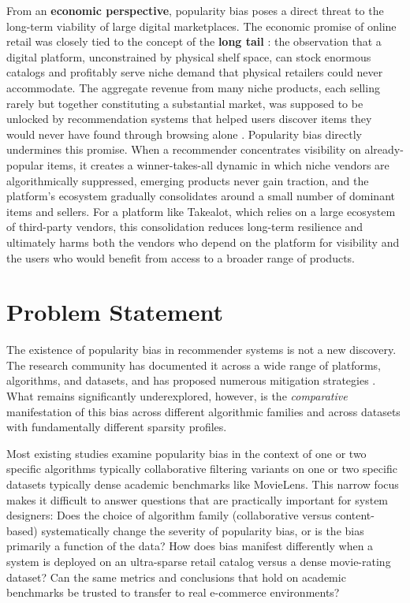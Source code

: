 \documentclass[11pt,a4paper]{report}
\begin{document}
From an \textbf{economic perspective}, popularity bias poses a direct threat to the long-term viability of large digital marketplaces. The economic promise of online retail was closely tied to the concept of the \textbf{long tail} \citep{anderson2004long}: the observation that a digital platform, unconstrained by physical shelf space, can stock enormous catalogs and profitably serve niche demand that physical retailers could never accommodate. The aggregate revenue from many niche products, each selling rarely but together constituting a substantial market, was supposed to be unlocked by recommendation systems that helped users discover items they would never have found through browsing alone \citep{brynjolfsson2006niches}. Popularity bias directly undermines this promise. When a recommender concentrates visibility on already-popular items, it creates a winner-takes-all dynamic \citep{anderson2004long} in which niche vendors are algorithmically suppressed, emerging products never gain traction, and the platform's ecosystem gradually consolidates around a small number of dominant items and sellers. For a platform like Takealot, which relies on a large ecosystem of third-party vendors, this consolidation reduces long-term resilience and ultimately harms both the vendors who depend on the platform for visibility and the users who would benefit from access to a broader range of products.

\section{Problem Statement}

The existence of popularity bias in recommender systems is not a new discovery. The research community has documented it across a wide range of platforms, algorithms, and datasets, and has proposed numerous mitigation strategies \citep{klimashevskaia2024survey}. What remains significantly underexplored, however, is the \emph{comparative} manifestation of this bias across different algorithmic families and across datasets with fundamentally different sparsity profiles.

Most existing studies examine popularity bias in the context of one or two specific algorithms typically collaborative filtering variants on one or two specific datasets typically dense academic benchmarks like MovieLens. This narrow focus makes it difficult to answer questions that are practically important for system designers: Does the choice of algorithm family (collaborative versus content-based) systematically change the severity of popularity bias, or is the bias primarily a function of the data? How does bias manifest differently when a system is deployed on an ultra-sparse retail catalog versus a dense movie-rating dataset? Can the same metrics and conclusions that hold on academic benchmarks be trusted to transfer to real e-commerce environments?
\end{document}

